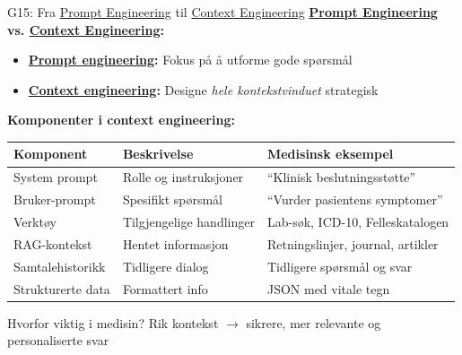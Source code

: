 \documentclass[aspectratio=169, 10pt]{beamer}
\begin{document}
\begin{frame}{G15: Fra \href{https://en.wikipedia.org/wiki/Prompt_engineering}{Prompt Engineering} til \href{https://www.anthropic.com/research/building-effective-agents}{Context Engineering}}
    \textbf{\href{https://en.wikipedia.org/wiki/Prompt_engineering}{Prompt Engineering} vs. \href{https://www.anthropic.com/research/building-effective-agents}{Context Engineering}:}
    \begin{itemize}
        \item \textbf{\href{https://en.wikipedia.org/wiki/Prompt_engineering}{Prompt engineering}:} Fokus på å utforme gode spørsmål
        \item \textbf{\href{https://www.anthropic.com/research/building-effective-agents}{Context engineering}:} Designe \textit{hele kontekstvinduet} strategisk
    \end{itemize}
    
    \vspace{0.2cm}
    \textbf{Komponenter i context engineering:}
    \footnotesize
    \begin{tabular}{lll}
        \toprule
        \textbf{Komponent} & \textbf{Beskrivelse} & \textbf{Medisinsk eksempel} \\
        \midrule
        System prompt & Rolle og instruksjoner & ``Klinisk beslutningsstøtte'' \\
        Bruker-prompt & Spesifikt spørsmål & ``Vurder pasientens symptomer'' \\
        Verktøy & Tilgjengelige handlinger & Lab-søk, ICD-10, Felleskatalogen \\
        RAG-kontekst & Hentet informasjon & Retningslinjer, journal, artikler \\
        Samtalehistorikk & Tidligere dialog & Tidligere spørsmål og svar \\
        Strukturerte data & Formattert info & JSON med vitale tegn \\
        \bottomrule
    \end{tabular}
    
    \normalsize
    \vspace{0.15cm}
    \begin{block}{\footnotesize Hvorfor viktig i medisin?}
        \footnotesize Rik kontekst $\rightarrow$ sikrere, mer relevante og personaliserte svar
    \end{block}
\end{frame}
\end{document}
